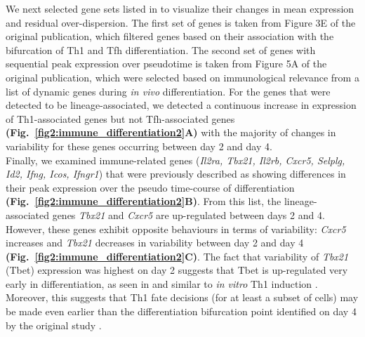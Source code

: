 We next selected gene sets listed in \cite{Lonnberg2017} to visualize their changes in mean expression and residual over-dispersion. The first set of genes is taken from Figure 3E of the original publication, which filtered genes based on their association with the bifurcation of Th1 and Tfh differentiation. The second set of genes with sequential peak expression over pseudotime is taken from Figure 5A of the original publication, which were selected based on immunological relevance from a list of dynamic genes during \textit{in vivo} differentiation. For the genes that were detected to be lineage-associated, we detected a continuous increase in expression of Th1-associated genes but not Tfh-associated genes \textbf{(Fig.~\ref{fig2:immune_differentiation2}A)} with the majority of changes in variability for these genes occurring between day 2 and day 4. \\

Finally, we examined immune-related genes (\textit{Il2ra, Tbx21, Il2rb, Cxcr5, Selplg, Id2, Ifng, Icos, Ifngr1}) that were previously described as showing differences in their peak expression over the pseudo time-course of differentiation \citep{Lonnberg2017} \textbf{(Fig.~\ref{fig2:immune_differentiation2}B)}. From this list, the lineage-associated genes \textit{Tbx21} and \textit{Cxcr5} are up-regulated between days 2 and 4. However, these genes  exhibit opposite behaviours in terms of variability: \textit{Cxcr5} increases and \textit{Tbx21} decreases in variability between day 2 and day 4 \textbf{(Fig.~\ref{fig2:immune_differentiation2}C)}. The fact that variability of \textit{Tbx21} (Tbet) expression was highest on day 2 suggests that Tbet is up-regulated very early in differentiation, as seen in \cite{Lonnberg2017} and similar to \textit{in vitro} Th1 induction \citep{Szabo2000}. Moreover, this suggests that Th1 fate decisions (for at least a subset of cells) may be made even earlier than the differentiation bifurcation point identified on day 4 by the original study \citep{Lonnberg2017}. 

\newpage

